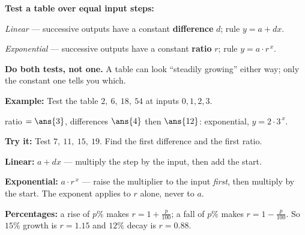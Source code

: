 \documentclass[12pt]{article}
\begin{document}


\begin{formulabox}
\textbf{Test a table over equal input steps:}\par
\emph{Linear} --- successive outputs have a constant \textbf{difference} $d$; rule $y = a + dx$.\par
\emph{Exponential} --- successive outputs have a constant \textbf{ratio} $r$; rule $y = a \cdot r^{\,x}$.\par
\textbf{Do both tests, not one.} A table can look ``steadily growing'' either way; only the constant one tells you which.
\end{formulabox}

\begin{examplebox}
\textbf{Example:} \quad Test the table $2,\ 6,\ 18,\ 54$ at inputs $0, 1, 2, 3$.

ratio $= \ans{3}$, differences $\ans{4}$ then $\ans{12}$: exponential, $y = 2 \cdot 3^{\,x}$.
\end{examplebox}

\begin{tryitbox}
\textbf{Try it:} \quad Test $7,\ 11,\ 15,\ 19$. Find the first difference and the first ratio.\\[2pt]
\end{tryitbox}


\begin{formulabox}
\textbf{Linear:} $a + dx$ --- multiply the step by the input, then add the start.\par
\textbf{Exponential:} $a \cdot r^{\,x}$ --- raise the multiplier to the input \emph{first}, then multiply by the start. The exponent applies to $r$ alone, never to $a$.\par
\textbf{Percentages:} a rise of $p\%$ makes $r = 1 + \frac{p}{100}$; a fall of $p\%$ makes $r = 1 - \frac{p}{100}$. So $15\%$ growth is $r = 1.15$ and $12\%$ decay is $r = 0.88$.
\end{formulabox}
\end{document}
